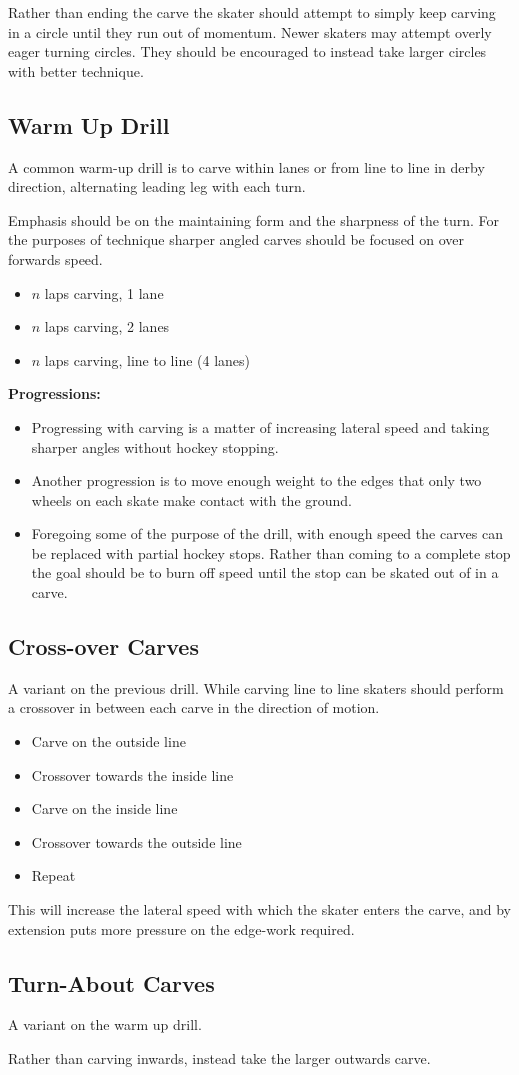 Rather than ending the carve the skater should attempt to simply keep carving in a circle until they run out of momentum. 
Newer skaters may attempt overly eager turning circles.  
They should be encouraged to instead take larger circles with better technique. 


\subsection*{Warm Up Drill}

A common warm-up drill is to carve within lanes or from line to line in derby direction, alternating leading leg with each turn.    

Emphasis should be on the maintaining form and the sharpness of the turn. For the purposes of technique sharper angled carves should be focused on over forwards speed. 

\begin{itemize}
\item $n$ laps carving, 1 lane 
\item $n$ laps carving, 2 lanes
\item $n$ laps carving, line to line (4 lanes)
\end{itemize}


{\bf Progressions:}

\begin{itemize}
    \item Progressing with carving is a matter of increasing lateral speed and taking sharper angles without hockey stopping. 
    \item  Another progression is to move enough weight to the edges that only two wheels on each skate make contact with the ground.
    \item Foregoing some of the purpose of the drill, with enough speed the carves can be replaced with partial hockey stops. Rather than coming to a complete stop the goal should be to burn off speed until the stop can be skated out of in a carve.    
\end{itemize}


\subsection*{Cross-over Carves}

A variant on the previous drill. 
While carving line to line skaters should perform a crossover in between each carve in the direction of motion.

\begin{itemize}
    \item Carve on the outside line
    \item Crossover towards the inside line 
    \item Carve on the inside line
    \item Crossover towards the outside line
    \item Repeat 
\end{itemize}

This will increase the lateral speed with which the skater enters the carve, and by extension puts more pressure on the edge-work required.      

\subsection*{Turn-About Carves}

A variant on the warm up drill.

Rather than carving inwards, instead take the larger outwards carve.  
